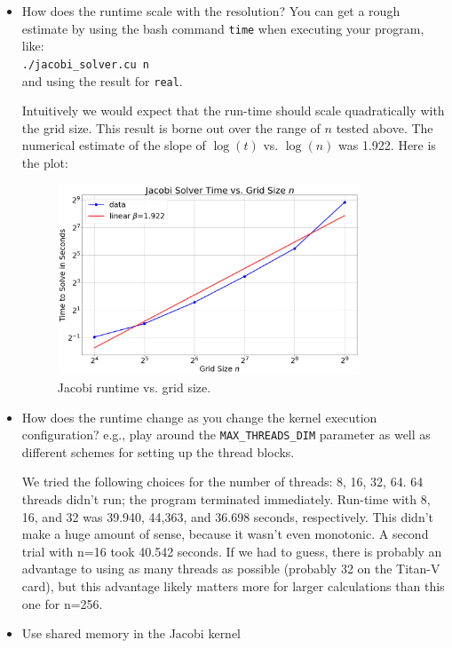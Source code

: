 \documentclass[11pt]{article}
\begin{document}
\begin{itemize}
      \item How does the runtime scale with the resolution? You can get a rough estimate by using the bash command \texttt{time} when executing your program, like:
    \vspace{3mm}\\ \texttt{./jacobi\_solver.cu n} \vspace{3mm}\\ and using the result for \texttt{real}. \\
    \begin{solution}
    Intuitively we would expect that the run-time should scale quadratically with the grid size.
    This result is borne out over the range of $n$ tested above.  
    The numerical estimate of the slope of $\log(t)$ vs. $\log(n)$ was 1.922.
    Here is the plot:
    \begin{figure}[H]
        \centering
        \includegraphics[width=0.85\textwidth]{jacobi_time.png}
        \caption{Jacobi runtime vs. grid size.}
    \end{figure}
    \end{solution}


      \item How does the runtime change as you change the kernel execution configuration?
        e.g., play around the \texttt{MAX\_THREADS\_DIM} parameter as well as different schemes for setting up the thread blocks.
        \begin{solution}
            We tried the following choices for the number of threads: 8, 16, 32, 64.
            64 threads didn't run; the program terminated immediately.
            Run-time with 8, 16, and 32 was 39.940, 44,363, and 36.698 seconds, respectively.
            This didn't make a huge amount of sense, because it wasn't even monotonic.
            A second trial with n=16 took 40.542 seconds.
            If we had to guess, there is probably an advantage to using as many threads as possible (probably 32 on the Titan-V card), but this advantage likely matters more for larger calculations than this one for n=256.
        \end{solution}

      \item Use shared memory in the Jacobi kernel
    \end{itemize}
    
\end{document}
